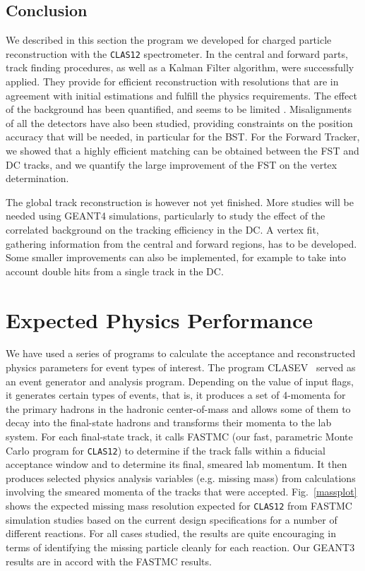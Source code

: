\subsection{Conclusion}

We described in this section the program we developed for charged particle 
reconstruction with the {\tt CLAS12} spectrometer.  In the central and forward 
parts, track finding procedures, as well as a Kalman Filter algorithm, were 
successfully applied.  They provide for efficient reconstruction with resolutions 
that are in agreement with initial estimations and fulfill the physics requirements. 
The effect of the background has been quantified, and seems to be limited . 
Misalignments of all the detectors have also been studied, providing constraints on 
the position accuracy that will be needed, in particular for the BST.  For the 
Forward Tracker, we showed that a highly efficient matching can be obtained between 
the FST and DC tracks, and we quantify the large improvement of the FST on the 
vertex determination.

The global track reconstruction is however not yet finished.  More studies will be 
needed using GEANT4 simulations, particularly to study the effect of the correlated 
background on the tracking efficiency in the DC.  A vertex fit, gathering 
information from the central and forward regions, has to be developed.  Some smaller 
improvements can also be implemented, for example to take into account double hits 
from a single track in the DC.

\section{Expected Physics Performance}

We have used a series of programs to calculate the acceptance and 
reconstructed physics parameters for event types of interest.  The program 
CLASEV~\cite{clasev} served as an event generator and analysis program. 
Depending on the value of input flags, it generates certain types of events, 
that is, it produces a set of 4-momenta for the primary hadrons in the 
hadronic center-of-mass and allows some of them to decay into the final-state 
hadrons and transforms their momenta to the lab system.  For each final-state 
track, it calls FASTMC (our fast, parametric Monte Carlo program for
{\tt CLAS12}) to determine if the track falls within a fiducial acceptance 
window and to determine its final, smeared lab momentum.  It then produces 
selected physics analysis variables (e.g. missing mass) from calculations 
involving the smeared momenta of the tracks that were accepted. 
Fig.~\ref{massplot} shows the expected missing mass resolution expected for 
{\tt CLAS12} from FASTMC simulation studies based on the current design 
specifications for a number of different reactions.  For all cases studied, 
the results are quite encouraging in terms of identifying the missing 
particle cleanly for each reaction.  Our GEANT3 results are in accord
with the FASTMC results.

